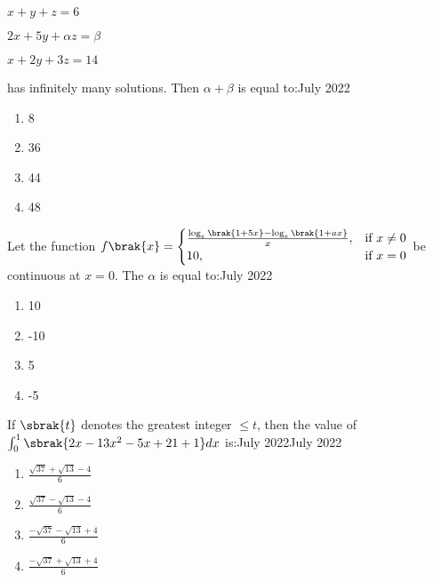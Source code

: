        $x + y + z = 6$
        
        $2x + 5y + \alpha z = \beta$
        
        $x + 2y + 3z = 14$
        
        has infinitely many solutions. Then $\alpha + \beta$ is equal to:\hfill{July 2022}
 
        \begin{multicols}{4}
        \begin{enumerate}
        \item 8
        \item 36
        \item 44
        \item 48
        \end{enumerate}
        \end{multicols}

    \item Let the function
        $f\brak{x}=\begin{cases}
        \frac{\log_{e}\brak{1+5x}-\log_{e}\brak{1+ax}}{x}, & \text{if } x\neq0 \\
        10, & \text{if } x=0
        \end{cases}$        
        be continuous at $x=0$. The $\alpha$ is equal to:\hfill{July 2022}
        
        \begin{multicols}{4}
        \begin{enumerate}
        \item 10
        \item -10
        \item 5
        \item -5
        \end{enumerate}
        \end{multicols}

    \item If $\sbrak{t}$ denotes the greatest integer $\leq t$, then the value of $\int_{0}^{1}\sbrak{2x-13x^{2}-5x+21+1}dx$ is:\hfill{July 2022}\hfill{July 2022}

        \begin{multicols}{4}
        \begin{enumerate}
        \item $\frac{\sqrt{37}+\sqrt{13}-4}{6}$
        \item $\frac{\sqrt{37}-\sqrt{13}-4}{6}$
        \item $\frac{-\sqrt{37}-\sqrt{13}+4}{6}$
        \item $\frac{-\sqrt{37}+\sqrt{13}+4}{6}$
        \end{enumerate}
        \end{multicols}

